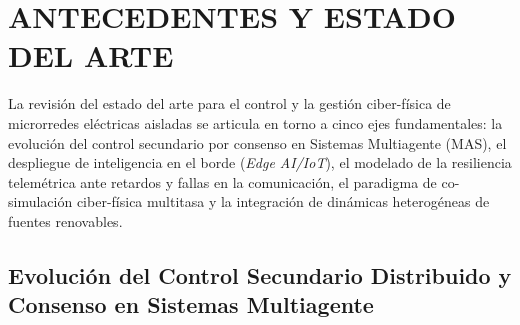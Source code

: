 \section{ANTECEDENTES Y ESTADO DEL ARTE}
\label{sec:antecedentes}

La revisión del estado del arte para el control y la gestión ciber-física de microrredes eléctricas aisladas se articula en torno a cinco ejes fundamentales: la evolución del control secundario por consenso en Sistemas Multiagente (MAS), el despliegue de inteligencia en el borde (\textit{Edge AI/IoT}), el modelado de la resiliencia telemétrica ante retardos y fallas en la comunicación, el paradigma de co-simulación ciber-física multitasa y la integración de dinámicas heterogéneas de fuentes renovables.

\subsection{Evolución del Control Secundario Distribuido y Consenso en Sistemas Multiagente}

